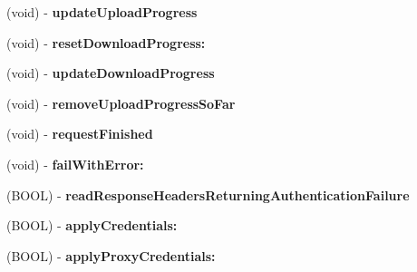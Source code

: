 \begin{DoxyCompactItemize}
\item 
\hypertarget{interface_a_s_i_h_t_t_p_request_a6d05241a54e897cff76e2e6f22d21d25}{
(void) -\/ {\bfseries updateUploadProgress}}
\label{interface_a_s_i_h_t_t_p_request_a6d05241a54e897cff76e2e6f22d21d25}

\item 
\hypertarget{interface_a_s_i_h_t_t_p_request_ab3355563b3c097d56e6a1297dcc1f89d}{
(void) -\/ {\bfseries resetDownloadProgress:}}
\label{interface_a_s_i_h_t_t_p_request_ab3355563b3c097d56e6a1297dcc1f89d}

\item 
\hypertarget{interface_a_s_i_h_t_t_p_request_ac8470a9d849263b37caebabf7c77afd7}{
(void) -\/ {\bfseries updateDownloadProgress}}
\label{interface_a_s_i_h_t_t_p_request_ac8470a9d849263b37caebabf7c77afd7}

\item 
\hypertarget{interface_a_s_i_h_t_t_p_request_aeacb8d68e8ca3bda46c608951c179d1d}{
(void) -\/ {\bfseries removeUploadProgressSoFar}}
\label{interface_a_s_i_h_t_t_p_request_aeacb8d68e8ca3bda46c608951c179d1d}

\item 
\hypertarget{interface_a_s_i_h_t_t_p_request_ae636d1ffd9c793678de501f48d9c22bb}{
(void) -\/ {\bfseries requestFinished}}
\label{interface_a_s_i_h_t_t_p_request_ae636d1ffd9c793678de501f48d9c22bb}

\item 
\hypertarget{interface_a_s_i_h_t_t_p_request_a7c50c7dc79b3d7a4f7cdd646c15e02e6}{
(void) -\/ {\bfseries failWithError:}}
\label{interface_a_s_i_h_t_t_p_request_a7c50c7dc79b3d7a4f7cdd646c15e02e6}

\item 
\hypertarget{interface_a_s_i_h_t_t_p_request_a6f680535f58523e106f688b79e0aaf67}{
(BOOL) -\/ {\bfseries readResponseHeadersReturningAuthenticationFailure}}
\label{interface_a_s_i_h_t_t_p_request_a6f680535f58523e106f688b79e0aaf67}

\item 
\hypertarget{interface_a_s_i_h_t_t_p_request_ade60b6e81c57c8ee8b616200ccb22930}{
(BOOL) -\/ {\bfseries applyCredentials:}}
\label{interface_a_s_i_h_t_t_p_request_ade60b6e81c57c8ee8b616200ccb22930}

\item 
\hypertarget{interface_a_s_i_h_t_t_p_request_a53e09e81268eb7230b4b5498ed2eb7d1}{
(BOOL) -\/ {\bfseries applyProxyCredentials:}}
\label{interface_a_s_i_h_t_t_p_request_a53e09e81268eb7230b4b5498ed2eb7d1}


\end{DoxyCompactItemize}
